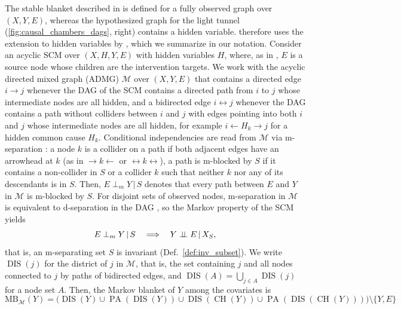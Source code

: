 \documentclass{article}
\newcommand{\MB}{\mathrm{MB}}
\DeclareMathOperator{\CH}{CH}
\DeclareMathOperator{\PA}{PA}
\DeclareMathOperator{\DIS}{DIS}
\newcommand{\indep}{\mbox{${}\perp\mkern-9mu\perp{}$}}
\newcommand{\given}{\,|\,}
\newcommand{\msep}{\mathrel{\perp_{m}}}
\begin{document}
The stable blanket \citep{pfisterStabilizingVariableSelection2021} described in  is defined for a fully observed graph over $(X, Y, E)$, whereas the hypothesized graph for the light tunnel (\cref{fig:causal_chambers_dags}, right) contains a hidden variable.
 therefore uses the extension to hidden variables by \citet[Sections~3 and~6]{xiangStableBlanketHidden2026}, which we summarize in our notation.
Consider an acyclic SCM over $(X, H, Y, E)$ with hidden variables $H$, where, as in , $E$ is a source node whose children are the intervention targets. We work with the acyclic directed mixed graph (ADMG) $\mathcal{M}$ over $(X, Y, E)$ that contains a directed edge $i \to j$ whenever the DAG of the SCM contains a directed path from $i$ to $j$ whose intermediate nodes are all hidden, and a bidirected edge $i \leftrightarrow j$ whenever the DAG contains a path without colliders between $i$ and $j$ with edges pointing into both $i$ and $j$ whose intermediate nodes are all hidden, for example $i \leftarrow H_k \to j$ for a hidden common cause $H_k$.
Conditional independencies are read from $\mathcal{M}$ via m-separation \citep{richardsonMarkovPropertiesAcyclic2003}: a node $k$ is a collider on a path if both adjacent edges have an arrowhead at $k$ (as in $\to k \leftarrow$ or $\leftrightarrow k \leftrightarrow$), a path is m-blocked by $S$ if it contains a non-collider in $S$ or a collider $k$ such that neither $k$ nor any of its descendants is in $S$. Then, $E \msep Y \given S$ denotes that every path between $E$ and $Y$ in $\mathcal{M}$ is m-blocked by $S$.
For disjoint sets of observed nodes, m-separation in $\mathcal{M}$ is equivalent to d-separation in the DAG \citep{vermaGraphicalAspectsCausal1993}, so the Markov property of the SCM yields
\begin{equation*}
    E \msep Y \given S \quad \Longrightarrow \quad Y \indep E \given X_S,
\end{equation*}
that is, an m-separating set $S$ is invariant (Def.~\ref{def:inv_subset}).
We write $\DIS(j)$ for the district of $j$ in $\mathcal{M}$, that is, the set containing $j$ and all nodes connected to $j$ by paths of bidirected edges, and $\DIS(A) = \bigcup_{j \in A} \DIS(j)$ for a node set $A$. Then, the Markov blanket of $Y$ among the covariates is
\begin{equation} \label{eq:admg_mb}
    \MB_{\mathcal{M}}(Y) = \big( \DIS(Y) \cup \PA(\DIS(Y)) \cup \DIS(\CH(Y)) \cup \PA(\DIS(\CH(Y))) \big) \setminus \{Y, E\}
\end{equation}
\end{document}
